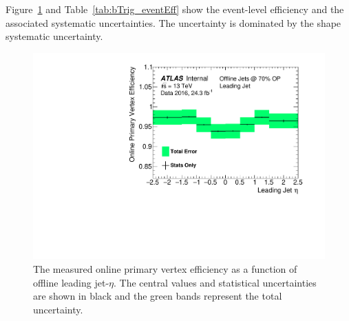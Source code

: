 Figure~\ref{fig:bTrig_eventSys} and Table~\ref{tab:bTrig_eventEff}
show the event-level efficiency and the associated systematic uncertainties.
The uncertainty is dominated by the shape systematic uncertainty.

\begin{figure}[!ht]
  \begin{center}
    \includegraphics[width=0.8\linewidth, angle=0]{figs/Trigger/fullSyst_EventEfficiency_leadingJetEta.pdf}
  \end{center}
  \caption[The measured online primary vertex efficiency as a function of offline leading jet-$\eta$.]
          {
    The measured online primary vertex efficiency as a function of offline leading jet-$\eta$.
    The central values and statistical uncertainties are shown in black and the green bands represent the total uncertainty.}
    \label{fig:bTrig_eventSys}
    \vspace{-1em}
\end{figure}


